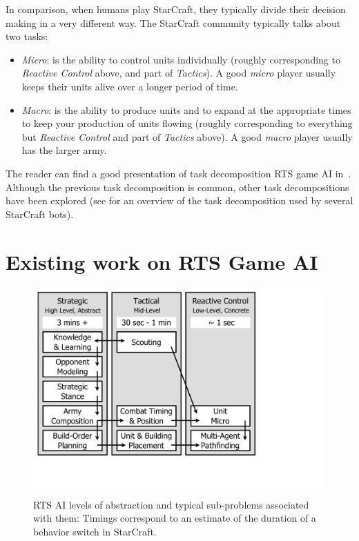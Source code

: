 \documentclass{llncs}
\begin{document}
In comparison, when humans play StarCraft, they typically divide their
decision  making in  a  very different  way.  The StarCraft  community
typically talks about two tasks:
\begin{itemize}
\item  {\em  Micro}: is  the  ability  to control  units  individually
  (roughly corresponding to {\em Reactive  Control} above, and part of
  {\em Tactics}). A good \emph{micro} player usually keeps their units
  alive over a longer period of time.
\item {\em  Macro}: is the ability  to produce units and  to expand at
  the  appropriate times  to  keep your  production  of units  flowing
  (roughly corresponding to everything  but {\em Reactive Control} and
  part of {\em Tactics} above). A good \emph{macro} player usually has
  the larger army.
\end{itemize}

The reader can find a good  presentation of task decomposition RTS game AI in~\cite{weber2011acs}.  Although  the   previous  task decomposition  is  common, other task decompositions have been explored (see \cite{ontanon2013survey} for an overview of the task decomposition used by several StarCraft bots).



\section{Existing work on RTS Game AI}\label{sec:review}

\begin{figure}
    \centering
    \includegraphics[width=0.7\columnwidth]{figures/categories}
    \caption{RTS  AI  levels  of abstraction  and  typical sub-problems associated with them:
      Timings correspond  to  an
      estimate   of   the   duration   of   a   behavior   switch   in
      StarCraft. %
      }
    \label{fig:levels-abstraction}
\end{figure}
\end{document}
